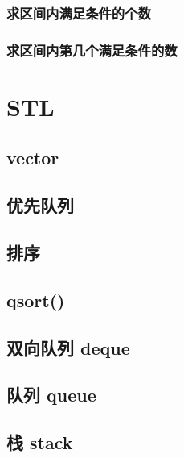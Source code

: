 \documentclass[a4paper]{article}
\begin{document}
\begin{CJK*}{UTF8}{gbsn}
\begin{multicols}{3}
\begin{flushleft}
\subsubsection{求区间内满足条件的个数}


\subsubsection{求区间内第几个满足条件的数}


\section{STL}
\subsection{vector}


\subsection{优先队列}


\subsection{排序}


\subsection{qsort()}


\subsection{双向队列 deque}


\subsection{队列 queue}


\subsection{栈 stack}



\end{flushleft}
\end{multicols}
\end{CJK*}
\end{document}
